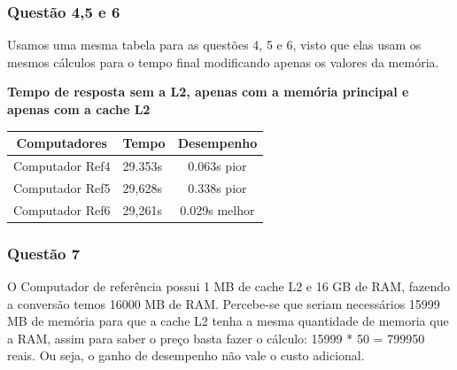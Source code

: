 \subsubsection{Questão 4,5 e 6}
\vspace{0.5cm}
\begin{center}
    Usamos uma mesma tabela para as questões 4, 5 e 6, visto que elas usam os mesmos cálculos para o tempo final modificando apenas os valores da memória.
    
    \vspace{0.5cm}
    \centering
    \begin{small}
         \textbf{Tempo de resposta sem a L2, apenas com a memória principal e apenas com a cache L2} \label{Tabela1}
        \hline
         \vspace{0.5cm}
            \begin{tabular}{|c|l|c|}
            \hline
            Computadores            & Tempo & Desempenho\\
            \hline
            Computador Ref4             & 29.353s & 0.063s pior \\
            Computador Ref5             & 29,628s & 0.338s pior\\
            Computador Ref6             & 29,261s & 0.029s melhor\\
            \hline
        \end{tabular}
    \end{small}
    
\end{center}
\vspace{0.5cm}

\subsubsection{Questão 7}
O Computador de referência possui 1 MB de cache L2 e 16 GB de RAM, fazendo a conversão temos 16000 MB de RAM. Percebe-se que seriam necessários 15999 MB de memória para que a cache L2 tenha a mesma quantidade de memoria que a RAM, assim para saber o preço basta fazer o cálculo: 15999 * 50 = 799950 reais. Ou seja, o ganho de desempenho não vale o custo adicional.

